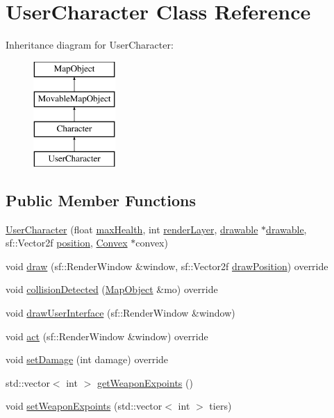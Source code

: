 \hypertarget{class_user_character}{}\section{User\+Character Class Reference}
\label{class_user_character}
Inheritance diagram for User\+Character\+:\begin{figure}[H]
\begin{center}
\leavevmode
\includegraphics[height=4.000000cm]{class_user_character}
\end{center}
\end{figure}
\subsection*{Public Member Functions}
\begin{DoxyCompactItemize}
\item 
\hyperlink{class_user_character_a9d2bb0c1adfa2738ba1b81300ef35c8c}{User\+Character} (float \hyperlink{class_character_a7abef33cbbbc2539fbcbe18c889c3cc4}{max\+Health}, int \hyperlink{class_map_object_ac7431860a4ca955dc3db173926be3856}{render\+Layer}, \hyperlink{classdrawable}{drawable} $\ast$\hyperlink{classdrawable}{drawable}, sf\+::\+Vector2f \hyperlink{class_map_object_a00491cbf8e4cbc729ef37e11f3473860}{position}, \hyperlink{class_convex}{Convex} $\ast$convex)
\item 
void \hyperlink{class_user_character_a01378e81642b46751454d91a80f6c4e9}{draw} (sf\+::\+Render\+Window \&window, sf\+::\+Vector2f \hyperlink{class_map_object_a3f383fa967b67989a1d30f8f9ff73936}{draw\+Position}) override
\item 
void \hyperlink{class_user_character_a3685c26490ad8d6fb3eb94cc9aa7fb73}{collision\+Detected} (\hyperlink{class_map_object}{Map\+Object} \&mo) override
\item 
void \hyperlink{class_user_character_a64cfe09ad2e3c173bc992a1862c55769}{draw\+User\+Interface} (sf\+::\+Render\+Window \&window)
\item 
void \hyperlink{class_user_character_a66f52c77755d4486c2d5db4db57322f3}{act} (sf\+::\+Render\+Window \&window) override
\item 
void \hyperlink{class_user_character_a3f835836af228eb6ea2fbada0c84c493}{set\+Damage} (int damage) override
\item 
std\+::vector$<$ int $>$ \hyperlink{class_user_character_a067772af35f279ba9c6b1542b3ab7717}{get\+Weapon\+Expoints} ()
\item 
void \hyperlink{class_user_character_a1cc878370f0610e79755989150f74705}{set\+Weapon\+Expoints} (std\+::vector$<$ int $>$ tiers)
\end{DoxyCompactItemize}
